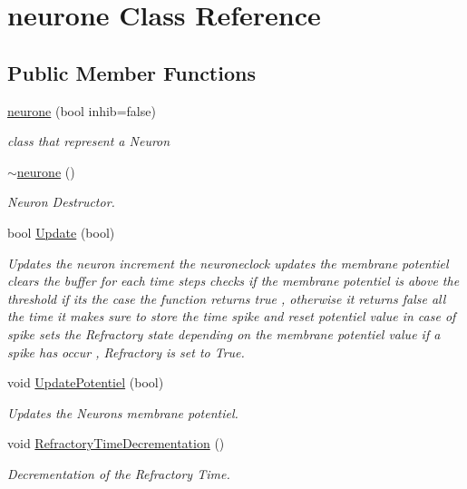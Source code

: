 \hypertarget{classneurone}{}\section{neurone Class Reference}
\label{classneurone}
\subsection*{Public Member Functions}
\begin{DoxyCompactItemize}
\item 
\hyperlink{classneurone_a45317bb4df99f1e79b5dd3d5ca7fe641}{neurone} (bool inhib=false)
\begin{DoxyCompactList}\small\item\em class that represent a Neuron \end{DoxyCompactList}\item 
\hyperlink{classneurone_a88029788e99ac38981e04959a777a227}{$\sim$neurone} ()
\begin{DoxyCompactList}\small\item\em Neuron Destructor. \end{DoxyCompactList}\item 
bool \hyperlink{classneurone_aa979624b96f5489a952e4ce0457ffdbc}{Update} (bool)
\begin{DoxyCompactList}\small\item\em Updates the neuron increment the neuroneclock updates the membrane potentiel clears the buffer for each time steps checks if the membrane potentiel is above the threshold if it\textquotesingle{}s the case the function returns true , otherwise it returns false all the time it makes sure to store the time spike and reset potentiel value in case of spike sets the Refractory state depending on the membrane potentiel value if a spike has occur , Refractory is set to True. \end{DoxyCompactList}\item 
void \hyperlink{classneurone_a374a8ad3b73985a8e5fff35bf5e223f7}{Update\+Potentiel} (bool)
\begin{DoxyCompactList}\small\item\em Updates the Neuron\textquotesingle{}s membrane potentiel. \end{DoxyCompactList}\item 
void \hyperlink{classneurone_ae24b7ac8addb3cc7b1b08042066576e6}{Refractory\+Time\+Decrementation} ()
\begin{DoxyCompactList}\small\item\em Decrementation of the Refractory Time. \end{DoxyCompactList}\item 

\end{DoxyCompactItemize}
